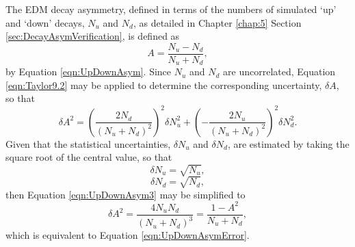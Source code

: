 \begin{appendices}
The EDM decay asymmetry, defined in terms of the numbers of simulated `up' and `down' decays, $N_{u}$ and $N_{d}$, as detailed in Chapter \ref{chap:5} Section \ref{sec:DecayAsymVerification}, is defined as 
%
\begin{equation}
  A = \frac{N_{u}-N_{d}}{N_{u}+N_{d}},
  \label{eqn:UpDownAsym2}
\end{equation}
%
by Equation \ref{eqn:UpDownAsym}. Since $N_{u}$ and $N_{d}$ are uncorrelated, Equation \ref{eqn:Taylor9.2} may be applied to determine the corresponding uncertainty, $\delta A$, so that
%
\begin{equation}
  \delta A^{2} = \left(\frac{2N_{d}}{(N_{u}+N_{d})^{2}}\right)^{2}\delta N_{u}^{2} + \left(-\frac{2N_{u}}{(N_{u}+N_{d})^{2}}\right)^{2}\delta N_{d}^{2}. 
  \label{eqn:UpDownAsym3}
\end{equation}
%
Given that the statistical uncertainties, $\delta N_{u}$ and $\delta N_{d}$, are estimated by taking the square root of the central value, so that 
%
\begin{equation}
   \delta N_{u} = \sqrt{N_{u}},
\end{equation}
\begin{equation}
   \delta N_{d} = \sqrt{N_{d}},
\end{equation}
%
then Equation \ref{eqn:UpDownAsym3} may be simplified to
%
\begin{equation}
  \delta A^{2} = \frac{4N_{u}N_{d}}{(N_{u}+N_{d})^{3}} = \frac{1-A^{2}}{N_{u}+N_{d}}, 
\end{equation}
%
which is equivalent to Equation \ref{eqn:UpDownAsymError}. 


\end{appendices}